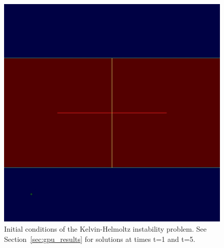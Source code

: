 \clearpage

\label{app:kh_instability_ics}

\begin{figure}[htbp]\figSpace
\begin{center} 
\includegraphics[width=0.5\textheight]{fig/kh0.jpg}
\caption{Initial conditions of the Kelvin-Helmoltz instability problem.  See Section~\ref{sec:gpu_results} for solutions at times t=1 and t=5.}
\end{center} 
\label{fig:kh_instability_ics}
\figSpace
\end{figure}


